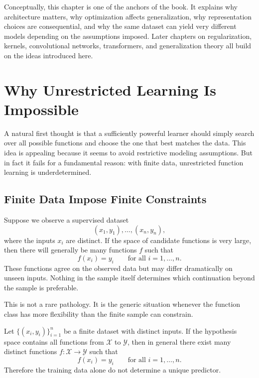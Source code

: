 Conceptually, this chapter is one of the anchors of the book. It explains why architecture matters, why optimization affects generalization, why representation choices are consequential, and why the same dataset can yield very different models depending on the assumptions imposed. Later chapters on regularization, kernels, convolutional networks, transformers, and generalization theory all build on the ideas introduced here.

\section{Why Unrestricted Learning Is Impossible}

A natural first thought is that a sufficiently powerful learner should simply search over all possible functions and choose the one that best matches the data. This idea is appealing because it seems to avoid restrictive modeling assumptions. But in fact it fails for a fundamental reason: with finite data, unrestricted function learning is underdetermined.

\subsection{Finite Data Impose Finite Constraints}

Suppose we observe a supervised dataset
\[
(x_1,y_1), \dots, (x_n,y_n),
\]
where the inputs $x_i$ are distinct. If the space of candidate functions is very large, then there will generally be many functions $f$ such that
\[
f(x_i)=y_i \qquad \text{for all } i=1,\dots,n.
\]
These functions agree on the observed data but may differ dramatically on unseen inputs. Nothing in the sample itself determines which continuation beyond the sample is preferable.

This is not a rare pathology. It is the generic situation whenever the function class has more flexibility than the finite sample can constrain.

\begin{proposition}
Let $\{(x_i,y_i)\}_{i=1}^n$ be a finite dataset with distinct inputs. If the hypothesis space contains all functions from $\mathcal{X}$ to $\mathcal{Y}$, then in general there exist many distinct functions $f:\mathcal{X}\to\mathcal{Y}$ such that
\[
f(x_i)=y_i \qquad \text{for all } i=1,\dots,n.
\]
Therefore the training data alone do not determine a unique predictor.
\end{proposition}

